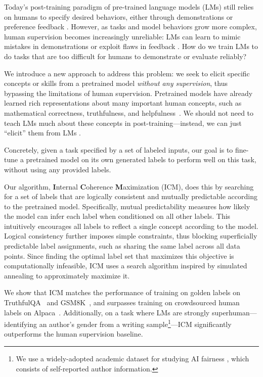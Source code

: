 \documentclass{article}
\newcommand{\ourmethod}[0]{\textsc{ICM}\xspace}
\begin{document}
Today's post-training paradigm of pre-trained language models (LMs) still relies on humans to specify desired behaviors, either through demonstrations or preference feedback \citep{ouyang2022training, glaese2022improving, bai2022training}.
However, as tasks and model behaviors grow more complex, human supervision becomes increasingly unreliable: LMs can learn to mimic mistakes in demonstrations \citep{asare2023github} or exploit flaws in feedback \citep{wen2024language}. How do we train LMs to do tasks that are too difficult for humans to demonstrate or evaluate reliably?

We introduce a new approach to address this problem: we seek to elicit specific concepts or skills from a pretrained model \emph{without any supervision}, thus bypassing the limitations of human supervision. Pretrained models have already learned rich representations about many important human concepts, such as mathematical correctness, truthfulness, and helpfulness~\citep{bubeck2023sparks}. We should not need to teach LMs much about these concepts in post-training---instead, we can just ``elicit'' them from LMs \citep{burns2022discovering}.

Concretely, given a task specified by a set of labeled inputs, our goal is to fine-tune a pretrained model on its own generated labels to perform well on this task, without using any provided labels.

Our algorithm, \textbf{I}nternal \textbf{C}oherence \textbf{M}aximization (\ourmethod), does this by searching for a set of labels that are logically consistent and mutually predictable according to the pretrained model. 
Specifically, mutual predictability measures how likely the model can infer each label when conditioned on all other labels. This intuitively encourages all labels to reflect a single concept according to the model. Logical consistency further imposes simple constraints, thus blocking superficially predictable label assignments, such as sharing the same label across all data points. Since finding the optimal label set that maximizes this objective is computationally infeasible, \ourmethod uses a search algorithm inspired by simulated annealing \citep{pirlot1996general} to approximately maximize it.

We show that \ourmethod matches the performance of training on golden labels on TruthfulQA~\citep{lin2021truthfulqa} and GSM8K~\citep{gsm8k}, and surpasses training on crowdsourced human labels on Alpaca~\citep{taori2023alpaca}. Additionally, on a task where LMs are strongly superhuman---identifying an author's gender from a writing sample\footnote{We use a widely-adopted academic dataset \citep{schler2006effects} for studying AI fairness \citep{coavoux2018privacy, lyu2020differentially}, which consists of self-reported author information. }---\ourmethod significantly outperforms the human supervision baseline.
\end{document}
